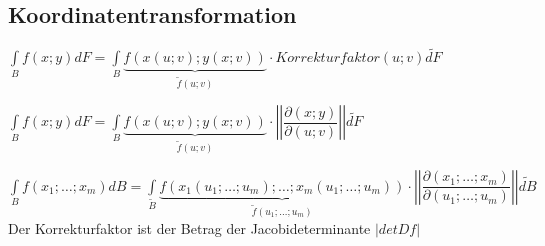 \subsection{Koordinatentransformation}
  $\int\limits_B f(x;y) dF = \int\limits_B \underbrace{f(x(u;v); y(x;v))}_{\tilde{f}(u;v)} \cdot Korrekturfaktor(u;v)   
  \tilde{dF}$
    
  $\int\limits_B f(x;y) dF = \int\limits_B \underbrace{f(x(u;v); y(x;v))}_{\tilde{f}(u;v)} \cdot 
  \left|\left|\dfrac{\partial (x;y)}{\partial (u;v)}\right|\right| \tilde{dF}$
    
  $\int\limits_B f(x_1;\ldots;x_m) dB = \int\limits_{\tilde{B}} 
  \underbrace{f(x_1(u_1;\ldots;u_m);\ldots; x_m(u_1;\ldots;u_m))}_{\tilde{f}(u_1;\ldots;u_m)} \cdot 
  \left|\left|\dfrac{\partial (x_1;\ldots;x_m)}{\partial (u_1;\ldots;u_m)}\right|\right| \tilde{dB}$ \\
   
  Der Korrekturfaktor ist der Betrag der Jacobideterminante $|detDf|$

 
